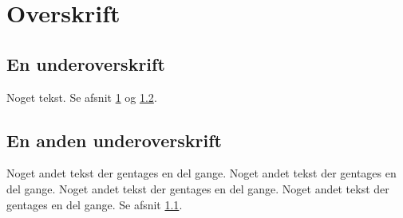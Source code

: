 \documentclass{article}
\begin{document}
\section{Overskrift}
\label{secOverskrift}

\subsection{En underoverskrift}
\label{subsecUnderoverskrift}
Noget tekst. Se afsnit \ref{secOverskrift} 
og \ref{subsecAndenunderoverskrift}.

\subsection{En anden underoverskrift}
\label{subsecAndenunderoverskrift}
Noget andet tekst der gentages en del gange.
Noget andet tekst der gentages en del gange.
Noget andet tekst der gentages en del gange.
Noget andet tekst der gentages en del gange.
Se afsnit \ref{subsecUnderoverskrift}.
\end{document}
